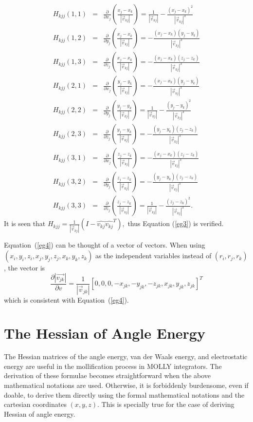 \documentclass[11pt]{article}
\newcommand{\hatv}[1]{\mbox{$\hat{{v}_{#1}}$}}
\newcommand{\AbsVv}[1]{\mbox{$\left| \vec{v}_{#1} \right| $}}
\begin{document}
\begin{eqnarray}
H_{kjj} (1,1) &=& \frac{\partial }{\partial{x_j}}
\left(\frac{x_j - x_k}{\AbsVv{kj}} \right) =
\frac{1}{\AbsVv{kj}} - \frac{(x_j-x_k)^2}{\AbsVv{kj}^3}\\
H_{kjj} (1,2) &=& \frac{\partial }{\partial{y_j}}
\left(\frac{x_j - x_k}{\AbsVv{kj}} \right) =
-\frac{(x_j-x_k) (y_j-y_k)}{\AbsVv{kj}^3}\\
H_{kjj} (1,3) &=& \frac{\partial }{\partial{z_j}}
\left(\frac{x_j - x_k}{\AbsVv{kj}} \right) =
- \frac{(x_j-x_k) (z_j-z_k)}{\AbsVv{kj}^3}\\
H_{kjj} (2,1) &=& \frac{\partial }{\partial{x_j}}
\left(\frac{y_j - y_k}{\AbsVv{kj}} \right) =
- \frac{(x_j-x_k) (y_j-y_k)}{\AbsVv{kj}^3}\\
H_{kjj} (2,2) &=& \frac{\partial }{\partial{y_j}}
\left(\frac{y_j - y_k}{\AbsVv{kj}} \right) =
\frac{1}{\AbsVv{kj}} - \frac{(y_j-y_k)^2}{\AbsVv{kj}^3}\\
H_{kjj} (2,3) &=& \frac{\partial }{\partial{z_j}}
\left(\frac{y_j - y_k}{\AbsVv{kj}} \right) =
- \frac{(y_j-y_k) (z_j - z_k)}{\AbsVv{kj}^3}\\
H_{kjj} (3,1) &=& \frac{\partial }{\partial{x_j}}
\left(\frac{z_j - z_k}{\AbsVv{kj}} \right) =
-\frac{(x_j-x_k) (z_j - z_k)}{\AbsVv{kj}^3}\\
H_{kjj} (3,2) &=& \frac{\partial }{\partial{y_j}}
\left(\frac{z_j - z_k}{\AbsVv{kj}} \right) =
-\frac{(y_j-y_k) (z_j-z_k)}{\AbsVv{kj}^3}\\
H_{kjj} (3,3) &=& \frac{\partial }{\partial{z_j}}
\left(\frac{z_j - z_k}{\AbsVv{kj}} \right) =
\frac{1}{\AbsVv{kj}} - \frac{(z_j-z_k)^2}{\AbsVv{kj}^3}.
\end{eqnarray}
It is seen that $H_{kjj} = \frac{1}{\AbsVv{kj}} (I -
\hatv{kj}\hatv{kj}^T),$ thus Equation (\ref{eg3}) is verified.

Equation~({\ref{eg4}}) can be thought of a vector of vectors. When
using $(x_i,y_i,z_i,x_j,y_j,z_j,x_k,y_k,z_k)$ as the independent
variables instead of $(r_i, r_j, r_k)$, the vector is
\begin{equation}
\frac{\partial 
\left|\vec{v_{jk}}\right|}
{\partial{v}} = \frac{1}{\AbsVv{jk}}
 [0,0,0,-x_{jk},-y_{jk},-z_{jk},x_{jk},y_{jk},z_{jk}]^T
\end{equation}
which is consistent with Equation~({\ref{eg4}}).



\section{The Hessian of Angle Energy}
The Hessian matrices of the angle energy, van der Waals energy, and
electrostatic energy are useful in the mollification process 
in MOLLY integrators. The derivation of these formulae becomes
straightforward when the above mathematical notations are
used. Otherwise, it is forbiddenly burdensome, even if doable, to
derive them directly using the formal mathematical notations and the
cartesian coordinates $(x, y, z)$. This is specially true for the case 
of deriving Hessian of angle energy.
\end{document}
